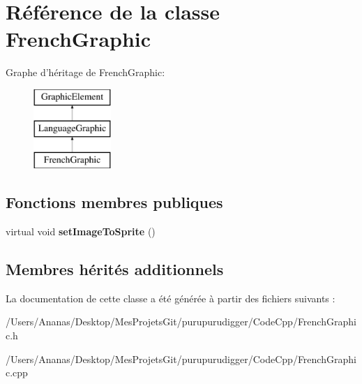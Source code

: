 \hypertarget{class_french_graphic}{\section{Référence de la classe French\-Graphic}
\label{class_french_graphic}
}
Graphe d'héritage de French\-Graphic\-:\begin{figure}[H]
\begin{center}
\leavevmode
\includegraphics[height=3.000000cm]{class_french_graphic}
\end{center}
\end{figure}
\subsection*{Fonctions membres publiques}
\begin{DoxyCompactItemize}
\item 
\hypertarget{class_french_graphic_aedbd7c9da10afd3e9f4f6fa6251ffc5c}{virtual void {\bfseries set\-Image\-To\-Sprite} ()}\label{class_french_graphic_aedbd7c9da10afd3e9f4f6fa6251ffc5c}

\end{DoxyCompactItemize}
\subsection*{Membres hérités additionnels}


La documentation de cette classe a été générée à partir des fichiers suivants \-:\begin{DoxyCompactItemize}
\item 
/\-Users/\-Ananas/\-Desktop/\-Mes\-Projets\-Git/purupurudigger/\-Code\-Cpp/French\-Graphic.\-h\item 
/\-Users/\-Ananas/\-Desktop/\-Mes\-Projets\-Git/purupurudigger/\-Code\-Cpp/French\-Graphic.\-cpp\end{DoxyCompactItemize}
